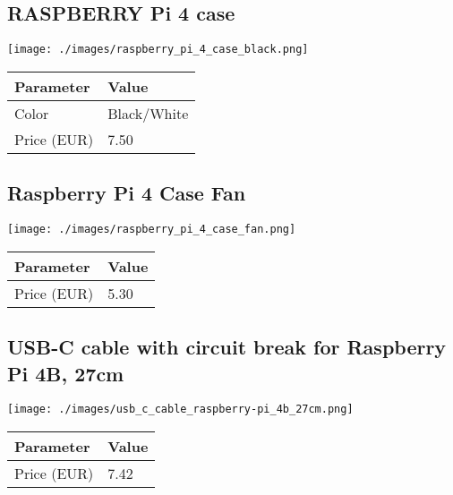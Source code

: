 \documentclass[10pt, a4paper, onecolumn, openany]{book} %
\begin{document}
\subsection{RASPBERRY Pi 4 case}
\begin{center}
    \texttt{[image: ./images/raspberry\_pi\_4\_case\_black.png]}
\end{center}
\begin{center}
    \begin{small}
    \begin{tabular}{|p{4cm}|p{4cm}|}
    \hline
    \textbf{Parameter} & \textbf{Value} \\
    \hline
    Color & Black/White \\
    \hline
    Price (EUR) & 7.50 \\
    \hline
    \end{tabular}
    \end{small}
\end{center}

\subsection{Raspberry Pi 4 Case Fan}
\begin{center}
    \texttt{[image: ./images/raspberry\_pi\_4\_case\_fan.png]}
\end{center}
\begin{center}
    \begin{small}
    \begin{tabular}{|p{4cm}|p{4cm}|}
    \hline
    \textbf{Parameter} & \textbf{Value} \\
    \hline
    Price (EUR) & 5.30 \\
    \hline
    \end{tabular}
    \end{small}
\end{center}

\subsection{USB-C cable with circuit break for Raspberry Pi 4B, 27cm}
\begin{center}
    \texttt{[image: ./images/usb\_c\_cable\_raspberry-pi\_4b\_27cm.png]}
\end{center}
\begin{center}
    \begin{small}
    \begin{tabular}{|p{4cm}|p{4cm}|}
    \hline
    \textbf{Parameter} & \textbf{Value} \\
    \hline
    Price (EUR) & 7.42 \\
    \hline
    \end{tabular}
    \end{small}
\end{center}
\end{document}
